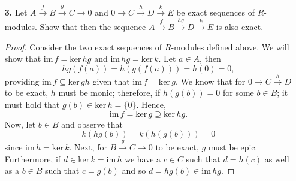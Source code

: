 \documentclass[ 12pt ]{article}
\begin{document}
\begin{enumerate}
	\item[\textbf{3.}] Let $A \xrightarrow{f} B \xrightarrow{g} C \to 0$ and $0 \to C \xrightarrow{h} D \xrightarrow{k} E$ be exact sequences of $R$-modules. Show that then the sequence $A \xrightarrow{f} B \xrightarrow{hg} D \xrightarrow{k} E$ is also exact.

		\begin{proof}
			Consider the two exact sequences of $R$-modules defined above. We will show that $\mathrm{im}\, f = \mathrm{ker}\, hg$ and $\mathrm{im}\, hg = \mathrm{ker}\, k$. Let $a \in A$, then $$hg(f(a)) = h(g(f(a))) = h(0) = 0,$$ providing $\mathrm{im}\, f \subseteq \mathrm{ker}\, gh$ given that $\mathrm{im}\, f = \mathrm{ker}\, g$. We know that for $0 \to C \xrightarrow{h} D$ to be exact, $h$ must be monic; therefore, if $h(g(b)) = 0$ for some $b \in B$; it must hold that $g(b) \in \mathrm{ker}\, h = \{ 0 \}$. Hence, $$\mathrm{im}\, f = \mathrm{ker}\, g \supseteq \mathrm{ker}\, hg.$$ Now, let $b \in B$ and observe that $$k(hg(b)) = k(h(g(b))) = 0$$ since $\mathrm{im}\, h = \mathrm{ker}\, k$. Next, for $B \xrightarrow{g} C \to 0$ to be exact, $g$ must be epic. Furthermore, if $d \in \mathrm{ker}\, k = \mathrm{im}\, h$ we have a $c \in C$ such that $d = h(c)$ as well as a $b \in B$ such that $c = g(b)$ and so $d = hg(b) \in \mathrm{im}\, hg$.
		\end{proof}



\end{enumerate}
\end{document}
